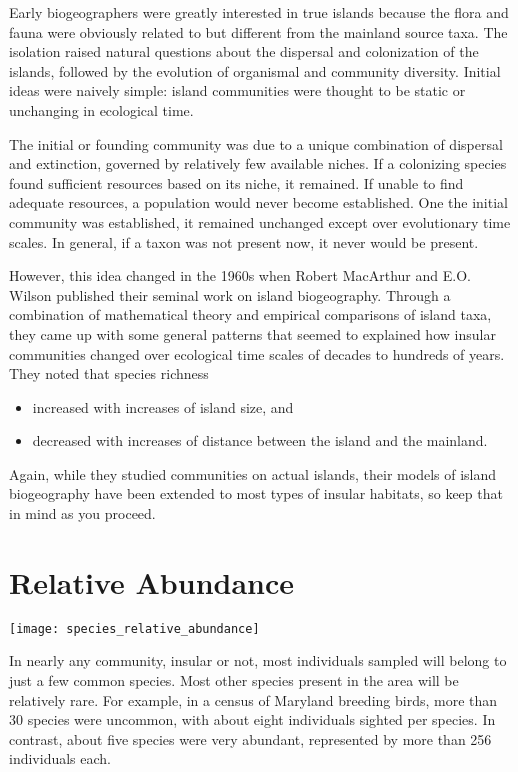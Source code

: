 \documentclass{tufte-handout}
\begin{document}
Early biogeographers were greatly interested in true islands because the flora and fauna were obviously related to but different from the mainland source taxa. The isolation raised natural questions about the dispersal and colonization of the islands, followed by the evolution of organismal and community diversity. Initial ideas were naively simple: island communities were thought to be static or unchanging in ecological time.  

The initial or founding community was due to a unique combination of dispersal and extinction, governed by relatively few available niches. If a colonizing species found sufficient resources based on its niche, it remained.  If unable to find adequate resources, a population would never become established. One the initial community was established, it remained unchanged except over evolutionary time scales.  In general, if a taxon was not present now, it never would be present.  

However, this idea changed in the 1960s when Robert MacArthur and E.O. Wilson published their seminal work on island biogeography. Through a combination of mathematical theory and empirical comparisons of island taxa, they came up with some general patterns that seemed to explained how insular communities changed over ecological time scales of decades to hundreds of years. They noted that species richness 
\begin{itemize}
	\item increased with increases of island size, and
	\item decreased with increases of distance between the island and the mainland.
\end{itemize}
Again, while they studied communities on actual islands, their models of island biogeography have been extended to most types of insular habitats, so keep that in mind as you proceed.

\section{Relative Abundance}\label{sec:relative_abundance}

\begin{marginfigure}%
	\centering
	\texttt{[image: species\_relative\_abundance]}
\end{marginfigure} 
In nearly any community, insular or not, most individuals sampled will belong to just a few common species.  Most other species present in the area will be relatively rare. For example, in a census of Maryland breeding birds, more than 30 species were uncommon, with about eight individuals sighted per species. In contrast, about five species were very abundant, represented by more than 256 individuals each.
\end{document}
